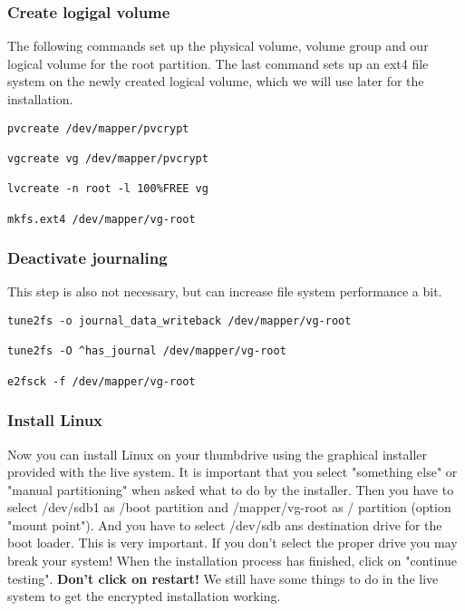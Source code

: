 \documentclass[12pt,a4paper]{article}
\begin{document}
\subsubsection{Create logigal volume}
The following commands set up the physical volume, volume group and our logical volume for the root partition. The last command sets up an ext4 file system on the newly created logical volume, which we will use later for the installation.
\begin{Verbatim}[commandchars=\\\{\}]
pvcreate /dev/mapper/pvcrypt

vgcreate vg /dev/mapper/pvcrypt

lvcreate -n root -l 100%FREE vg

mkfs.ext4 /dev/mapper/vg-root

\end{Verbatim}

\subsubsection{Deactivate journaling}
This step is also not necessary, but can increase file system performance a bit.
\begin{Verbatim}[commandchars=\\\{\}]
tune2fs -o journal_data_writeback /dev/mapper/vg-root

tune2fs -O ^has_journal /dev/mapper/vg-root

e2fsck -f /dev/mapper/vg-root
\end{Verbatim}

\subsubsection{Install Linux}
Now you can install Linux on your thumbdrive using the graphical installer provided with the live system. It is important that you select "something else" or "manual partitioning" when asked what to do by the installer. Then you have to select /dev/sdb1 as /boot partition and /mapper/vg-root as / partition (option "mount point"). And you have to select /dev/sdb ans destination drive for the boot loader. This is very important. If you don't select the proper drive you may break your system! When the installation process has finished, click on "continue testing". \textbf{Don't click on restart!} We still have some things to do in the live system to get the encrypted installation working.
\end{document}
